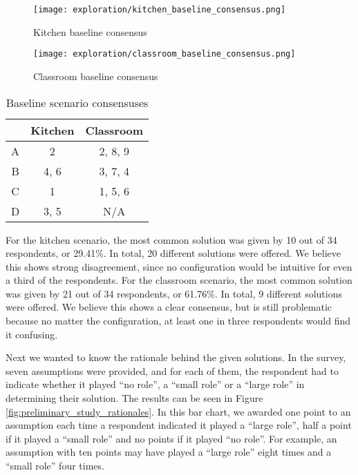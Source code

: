 \begin{figure}
    \centering
    \texttt{[image: exploration/kitchen\_baseline\_consensus.png]}
    \caption{Kitchen baseline consensus}
    \label{fig:preliminary_study_kitchen_baseline_consensus}
\end{figure}

\begin{figure}
    \centering
    \texttt{[image: exploration/classroom\_baseline\_consensus.png]}
    \caption{Classroom baseline consensus}
    \label{fig:preliminary_study_classroom_baseline_consensus}
\end{figure}

\begin{table}
    \centering
    \begin{tabular}{|c|c|c|} 
    \hline
      & Kitchen & Classroom \\
    \hline
    A & 2       & 2, 8, 9   \\
    B & 4, 6    & 3, 7, 4   \\
    C & 1       & 1, 5, 6   \\
    D & 3, 5    & N/A       \\
    \hline
\end{tabular}
\caption{Baseline scenario consensuses}
\label{table:preliminary_study_consensus}
\end{table}

For the kitchen scenario, the most common solution was given by 10 out of 34 respondents, or 29.41\%. In total, 20 different solutions were offered. We believe this shows strong disagreement, since no configuration would be intuitive for even a third of the respondents. For the classroom scenario, the most common solution was given by 21 out of 34 respondents, or 61.76\%. In total, 9 different solutions were offered. We believe this shows a clear consensus, but is still problematic because no matter the configuration, at least one in three respondents would find it confusing.

Next we wanted to know the rationale behind the given solutions. In the survey, seven assumptions were provided, and for each of them, the respondent had to indicate whether it played ``no role'', a ``small role'' or a ``large role'' in determining their solution. The results can be seen in Figure \ref{fig:preliminary_study_rationales}. In this bar chart, we awarded one point to an assumption each time a respondent indicated it played a ``large role'', half a point if it played a ``small role'' and no points if it played ``no role''. For example, an assumption with ten points may have played a ``large role'' eight times and a ``small role'' four times.

